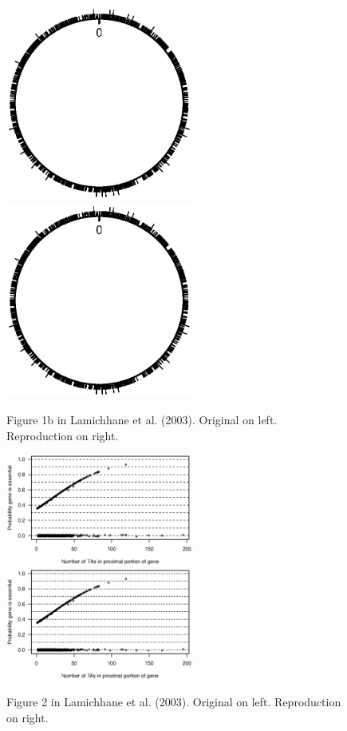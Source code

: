 \begin{figure}
\includegraphics[viewport=179 299 438 517, width=0.55\textwidth]{../talk/Figs/circlefig.ps}
\hfill
\includegraphics[viewport=179 299 438 517, width=0.55\textwidth]{../reproduction/Figs/circlefig.ps}

\caption{Figure 1b in Lamichhane et al. (2003). Original on left. Reproduction on right.}
\end{figure}

\begin{figure}
\includegraphics[viewport=44 245 525 508, width=0.55\textwidth]{../original/Nov02/R/Figs/fig2.ps}
\hfill
\includegraphics[viewport=44 245 525 508, width=0.55\textwidth]{../reproduction/Figs/fig2.ps}

\caption{Figure 2 in Lamichhane et al. (2003). Original on left. Reproduction on right.}
\end{figure}
